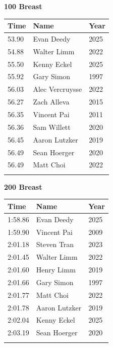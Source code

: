 \vspace{1.2em}
\noindent\begin{minipage}[t]{0.48\textwidth}
\centering
\textbf{\textcolor{teamprimary}{100 Breast}}\par
\vspace{0.5em}
\centering
\small
\renewcommand{\arraystretch}{1.0}
\setlength{\tabcolsep}{4pt}
\begin{tabular}{@{}p{1.8cm}p{3.0cm}p{1.0cm}@{}}
\toprule
\textbf{Time} & \textbf{Name} & \textbf{Year} \\
\midrule
53.90 & Evan Deedy & 2025 \\
54.88 & Walter Limm & 2022 \\
55.50 & Kenny Eckel & 2025 \\
55.92 & Gary Simon & 1997 \\
56.03 & Alec Vercruysse & 2022 \\
56.27 & Zach Alleva & 2015 \\
56.35 & Vincent Pai & 2011 \\
56.36 & Sam Willett & 2020 \\
56.45 & Aaron Lutzker & 2019 \\
56.49 & Sean Hoerger & 2020 \\
56.49 & Matt Choi & 2022 \\
\bottomrule
\vspace{0.5em}
\end{tabular}
\end{minipage}
\hfill
\begin{minipage}[t]{0.48\textwidth}
\centering
\textbf{\textcolor{teamprimary}{200 Breast}}\par
\vspace{0.5em}
\centering
\small
\renewcommand{\arraystretch}{1.0}
\setlength{\tabcolsep}{4pt}
\begin{tabular}{@{}p{1.8cm}p{3.0cm}p{1.0cm}@{}}
\toprule
\textbf{Time} & \textbf{Name} & \textbf{Year} \\
\midrule
1:58.86 & Evan Deedy & 2025 \\
1:59.90 & Vincent Pai & 2009 \\
2:01.18 & Steven Tran & 2023 \\
2:01.45 & Walter Limm & 2022 \\
2:01.60 & Henry Limm & 2019 \\
2:01.66 & Gary Simon & 1997 \\
2:01.77 & Matt Choi & 2022 \\
2:01.78 & Aaron Lutzker & 2019 \\
2:02.04 & Kenny Eckel & 2025 \\
2:03.19 & Sean Hoerger & 2020 \\
\bottomrule
\vspace{0.5em}
\end{tabular}
\end{minipage}
